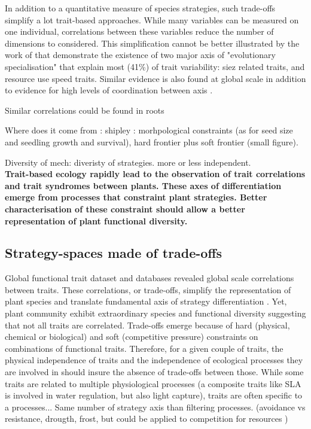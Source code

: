 In addition to a quantitative measure of species strategies, such trade-offs simplify a lot trait-based approaches. While many variables can be measured on one individual, correlations between these variables reduce the number of dimensions to considered. This simplification cannot be better illustrated by the work of \cite{diaz_plant_2004} that demonstrate the existence of two major axis of "evolutionary specialisation" that explain most (41\%) of trait variability: siez related traits, and resource use speed traits. Similar evidence is also found at global scale in addition to evidence for high levels of coordination between axis \parencite{diaz_global_2016}.


Similar correlations could be found in roots \cite{ ryser_importance_1996, reich_world-wide_2014}

Where does it come from : shipley : morhpological constraints (as for seed size and seedling growth and survival), hard frontier plus soft frontier (small figure).

Diversity of mech: diveristy of strategies. more or less independent.\\

\textbf{Trait-based ecology rapidly lead to the observation of trait correlations and trait syndromes between plants. These axes of differentiation emerge from processes that constraint plant strategies. Better characterisation of these constraint should allow a better representation of plant functional diversity.}

\subsection{Strategy-spaces made of trade-offs}

Global functional trait dataset and databases revealed global scale correlations between traits. These correlations, or trade-offs, simplify the representation of plant species \parencite{diaz_global_2016} and translate fundamental axis of strategy differentiation \parencite{reich_world-wilde_2013}. Yet, plant community exhibit extraordinary species and functional diversity suggesting that not all traits are correlated. Trade-offs emerge because of hard (physical, chemical or biological) and soft (competitive pressure) constraints on combinations of functional traits. Therefore, for a given couple of traits, the physical independence of traits and the independence of ecological processes they are involved in should insure the absence of trade-offs between those. While some traits are related to multiple physiological processes (a composite traits like SLA is involved in water regulation, but also light capture), traits are often specific to a processes...
Same number of strategy axis than filtering processes. (avoidance vs resistance, drougth, frost, but could be applied to competition for resources )


